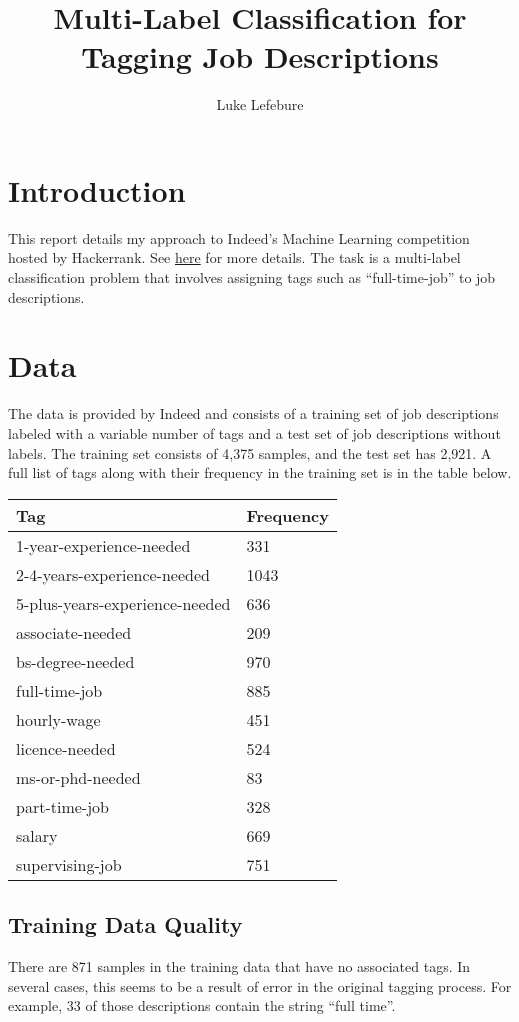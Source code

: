 \documentclass{article}
\title{Multi-Label Classification for Tagging Job Descriptions}
\author{Luke Lefebure}
\begin{document}
\maketitle

\section{Introduction}
This report details my approach to Indeed's Machine Learning competition hosted by Hackerrank. See \href{https://www.hackerrank.com/indeed-ml-codesprint-2017}{here} for more details. The task is a multi-label classification problem that involves assigning tags such as ``full-time-job'' to job descriptions.

\section{Data}
The data is provided by Indeed and consists of a training set of job descriptions labeled with a variable number of tags and a test set of job descriptions without labels. The training set consists of 4,375 samples, and the test set has 2,921. A full list of tags along with their frequency in the training set is in the table below.

\begin{center}
	\begin{tabular}{ | l | l | }
		\hline
		\textbf{Tag} & \textbf{Frequency} \\ \hline
		1-year-experience-needed & 331 \\
		2-4-years-experience-needed & 1043 \\
		5-plus-years-experience-needed & 636 \\
		associate-needed & 209 \\
		bs-degree-needed & 970 \\
		full-time-job & 885 \\
		hourly-wage & 451 \\
		licence-needed & 524 \\
		ms-or-phd-needed & 83 \\
		part-time-job & 328 \\
		salary & 669 \\
		supervising-job & 751 \\
		\hline
	\end{tabular}
\end{center}

\subsection{Training Data Quality}
There are 871 samples in the training data that have no associated tags. In several cases, this seems to be a result of error in the original tagging process. For example, 33 of those descriptions contain the string ``full time''.
\end{document}
